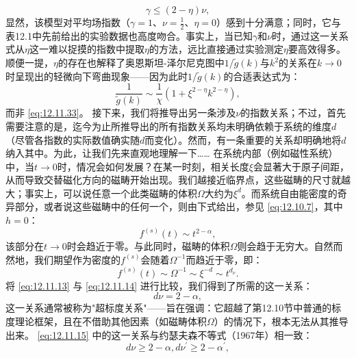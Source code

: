\begin{equation}\tag{12.12.12}\label{eq:12.12.12}
\gamma \leq ( 2 - \eta ) \nu ,
\end{equation}
显然，该模型对平均场指数（\(\gamma=1\)、\(\nu=\frac{1}{2}\)、\(\eta=0\)）感到十分满意；同时，它与表12.1中先前给出的实验数据也高度吻合。事实上，当已知\(\gamma\)和\(\nu\)时，通过这一关系式从\(\eta\)这一难以捉摸的指数中提取\(\eta\)的方法，远比直接通过实验测定\(\eta\)要高效得多。顺便一提，\(\eta\)的存在也解释了奥恩斯坦-泽尔尼克图中\(1/\tilde{g}(k)\)与\(k^2\)的关系在\(k\to0\)时呈现出的轻微向下弯曲现象——因为此时\(1/\tilde{g}(k)\)的合适表达式为：
\begin{equation}\tag{12.12.13}\label{eq:12.12.13}
\frac { 1 } { \tilde { g } ( k ) } \sim \frac { 1 } { \chi } ( 1 + \xi ^{2 - \eta} k ^{2 - \eta} ) ,
\end{equation}
而非 \autoref{eq:12.11.33}。
接下来，我们将推导出另一条涉及\(\nu\)的指数关系；不过，首先需要注意的是，迄今为止所推导出的所有指数关系均未明确依赖于系统的维度\(d\)（尽管各指数的实际数值确实随\(d\)而变化）。然而，有一条重要的关系却明确地将\(d\)纳入其中。为此，让我们先来直观地理解一下\ldots\ldots{}
在系统内部（例如磁性系统）中，当\(t\to0\)时，情况会如何发展？在某一时刻，相关长度\(\xi\)会显著大于原子间距，从而导致交替磁化方向的磁畴开始出现。我们越接近临界点，这些磁畴的尺寸就越大；事实上，可以说任意一个此类磁畴的体积\(\Omega\)大约为\(\xi^d\)。而系统自由能密度的奇异部分，或者说这些磁畴中的任何一个，则由下式给出，参见 \autoref{eq:12.10.7}，其中\(h=0\)：
\begin{equation}\tag{12.12.14}\label{eq:12.12.14}
f ^{( s )} ( t ) \sim t ^{2 - \alpha} ,
\end{equation}
该部分在\(t\to0\)时会趋近于零。与此同时，磁畴的体积\(\Omega\)则会趋于无穷大。自然而然地，我们期望作为密度的\(f^{(s)}\)会随着\(\Omega^{-1}\)而趋近于零，即：
\begin{equation}\tag{12.12.15}\label{eq:12.12.15}
f ^{( s )} ( t ) \sim \Omega ^{- 1} \sim \xi ^{- d} \sim t ^{d _ { \nu} } .
\end{equation}
将 \autoref{eq:12.11.13} 与 \autoref{eq:12.11.14} 进行比较，我们得到了所需的这一关系：
\begin{equation}\tag{12.12.16}\label{eq:12.12.16}
d \nu = 2 - \alpha ,
\end{equation}
这一关系通常被称为"超标度关系"——旨在强调：它超越了第12.10节中普通的标度理论框架，且在不借助其他因素（如磁畴体积\(\Omega\)）的情况下，根本无法从其推导出来。
\autoref{eq:12.11.15} 中的这一关系与约瑟夫森不等式（1967年）相一致：
\begin{equation}\tag{12.12.17}\label{eq:12.12.17}
d \nu \geq 2 - \alpha ,  d \nu ^{\prime} \geq 2 - \alpha ^{\prime} ,
\end{equation}

